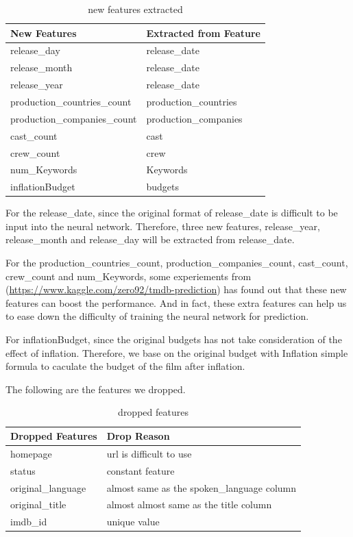 \documentclass{article}
\begin{document}
	\begin{table}[htb]
	\caption{new features extracted}
	\label{sample-table}
	\centering
	\begin{tabular}{ll}
		\toprule
		\cmidrule{1-2}
		New Features &  Extracted from Feature \\
		\midrule
		release\_day & release\_date \\
		release\_month & release\_date \\
		release\_year & release\_date \\
		production\_countries\_count & production\_countries \\
		production\_companies\_count & production\_companies \\
		cast\_count & cast \\
		crew\_count & crew \\
		num\_Keywords & Keywords \\
		inflationBudget & budgets \\
		
	\end{tabular}
\end{table}
	
	For the release\_date, since the original format of release\_date is difficult to be input into the neural network. Therefore, three new features, release\_year, release\_month and release\_day will be extracted from release\_date.
	
	For the production\_countries\_count, production\_companies\_count, cast\_count, crew\_count and num\_Keywords, some experiements from (\url{https://www.kaggle.com/zero92/tmdb-prediction}) has found out that these new features can boost the performance. And in fact, these extra features can help us to ease down the difficulty of training the neural network for prediction.
	
	For inflationBudget, since the original budgets has not take consideration of the effect of inflation. Therefore, we base on the original budget with Inflation simple formula to caculate the budget of the film after inflation.
	
The following are the features we dropped.
	\begin{table}[htb]
	\caption{dropped features}
	\label{sample-table}
	\centering
	\begin{tabular}{ll}
		\toprule
		\cmidrule{1-2}
		Dropped Features & Drop Reason \\
		\midrule
		homepage & url is difficult to use\\
		status & constant feature \\  
		original\_language & almost same as the spoken\_language column \\
		original\_title & almost almost same as the title column \\
		imdb\_id\ & unique value \\
	\end{tabular}
\end{table}
\end{document}
